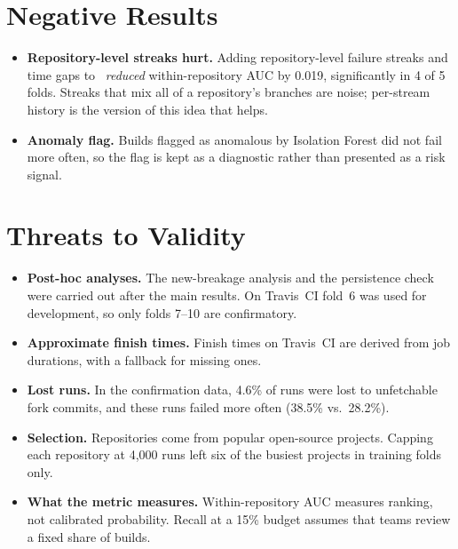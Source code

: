 \section{Negative Results}
\label{sec:negative}
\begin{itemize}
\item \textbf{Repository-level streaks hurt.} Adding repository-level failure streaks and time gaps to \tierC\ \emph{reduced} within-repository AUC by 0.019, significantly in 4 of 5 folds. Streaks that mix all of a repository's branches are noise; per-stream history is the version of this idea that helps.
\item \textbf{Anomaly flag.} Builds flagged as anomalous by Isolation Forest did not fail more often, so the flag is kept as a diagnostic rather than presented as a risk signal.
\end{itemize}

\section{Threats to Validity}
\label{sec:threats}
\begin{itemize}
\item \textbf{Post-hoc analyses.} The new-breakage analysis and the persistence check were carried out after the main results. On Travis~CI fold~6 was used for development, so only folds 7--10 are confirmatory.
\item \textbf{Approximate finish times.} Finish times on Travis~CI are derived from job durations, with a fallback for missing ones.
\item \textbf{Lost runs.} In the confirmation data, 4.6\% of runs were lost to unfetchable fork commits, and these runs failed more often (38.5\% vs.\ 28.2\%).
\item \textbf{Selection.} Repositories come from popular open-source projects. Capping each repository at 4,000 runs left six of the busiest projects in training folds only.
\item \textbf{What the metric measures.} Within-repository AUC measures ranking, not calibrated probability. Recall at a 15\% budget assumes that teams review a fixed share of builds.
\end{itemize}

